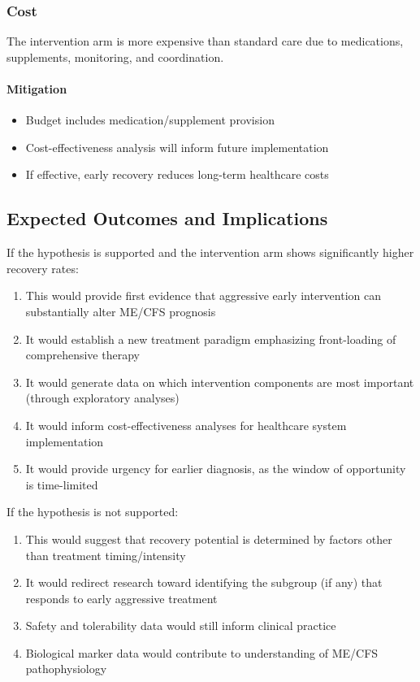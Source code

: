\subsubsection{Cost}
The intervention arm is more expensive than standard care due to medications, supplements, monitoring, and coordination.

\paragraph{Mitigation}
\begin{itemize}
    \item Budget includes medication/supplement provision
    \item Cost-effectiveness analysis will inform future implementation
    \item If effective, early recovery reduces long-term healthcare costs
\end{itemize}

\subsection{Expected Outcomes and Implications}

If the hypothesis is supported and the intervention arm shows significantly higher recovery rates:
\begin{enumerate}
    \item This would provide first evidence that aggressive early intervention can substantially alter ME/CFS prognosis
    \item It would establish a new treatment paradigm emphasizing front-loading of comprehensive therapy
    \item It would generate data on which intervention components are most important (through exploratory analyses)
    \item It would inform cost-effectiveness analyses for healthcare system implementation
    \item It would provide urgency for earlier diagnosis, as the window of opportunity is time-limited
\end{enumerate}

If the hypothesis is not supported:
\begin{enumerate}
    \item This would suggest that recovery potential is determined by factors other than treatment timing/intensity
    \item It would redirect research toward identifying the subgroup (if any) that responds to early aggressive treatment
    \item Safety and tolerability data would still inform clinical practice
    \item Biological marker data would contribute to understanding of ME/CFS pathophysiology
\end{enumerate}

